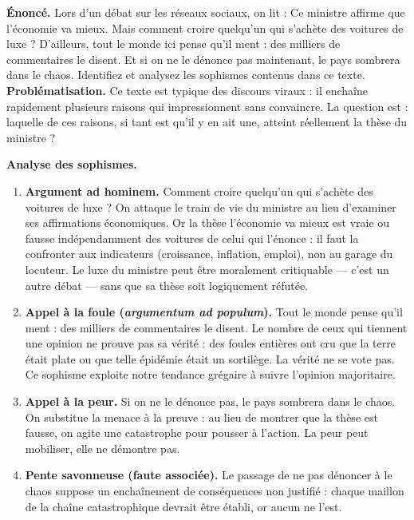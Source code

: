 \documentclass[11pt]{article}
\begin{document}
\begin{exoresolu}
\textbf{Énoncé.} Lors d'un débat sur les réseaux sociaux, on lit : \guillemotleft Ce ministre affirme que l'économie va mieux. Mais comment croire quelqu'un qui s'achète des voitures de luxe ? D'ailleurs, tout le monde ici pense qu'il ment : des milliers de commentaires le disent. Et si on ne le dénonce pas maintenant, le pays sombrera dans le chaos. \guillemotright Identifiez et analysez les sophismes contenus dans ce texte.
\tcblower
\textbf{Problématisation.} Ce texte est typique des discours viraux : il enchaîne rapidement plusieurs \guillemotleft raisons \guillemotright qui impressionnent sans convaincre. La question est : laquelle de ces raisons, si tant est qu'il y en ait une, atteint réellement la thèse du ministre ?

\textbf{Analyse des sophismes.}
\begin{enumerate}
\item \textbf{Argument ad hominem.} \guillemotleft Comment croire quelqu'un qui s'achète des voitures de luxe ? \guillemotright On attaque le train de vie du ministre au lieu d'examiner ses affirmations économiques. Or la thèse \guillemotleft l'économie va mieux \guillemotright est vraie ou fausse indépendamment des voitures de celui qui l'énonce : il faut la confronter aux indicateurs (croissance, inflation, emploi), non au garage du locuteur. Le luxe du ministre peut être moralement critiquable — c'est un autre débat — sans que sa thèse soit logiquement réfutée.
\item \textbf{Appel à la foule (\emph{argumentum ad populum}).} \guillemotleft Tout le monde pense qu'il ment : des milliers de commentaires le disent. \guillemotright Le nombre de ceux qui tiennent une opinion ne prouve pas sa vérité : des foules entières ont cru que la terre était plate ou que telle épidémie était un sortilège. La vérité ne se vote pas. Ce sophisme exploite notre tendance grégaire à suivre l'opinion majoritaire.
\item \textbf{Appel à la peur.} \guillemotleft Si on ne le dénonce pas, le pays sombrera dans le chaos. \guillemotright On substitue la menace à la preuve : au lieu de montrer que la thèse est fausse, on agite une catastrophe pour pousser à l'action. La peur peut mobiliser, elle ne démontre pas.
\item \textbf{Pente savonneuse (faute associée).} Le passage de \guillemotleft ne pas dénoncer \guillemotright à \guillemotleft le chaos \guillemotright suppose un enchaînement de conséquences non justifié : chaque maillon de la chaîne catastrophique devrait être établi, or aucun ne l'est.
\end{enumerate}


\end{exoresolu}
\end{document}
